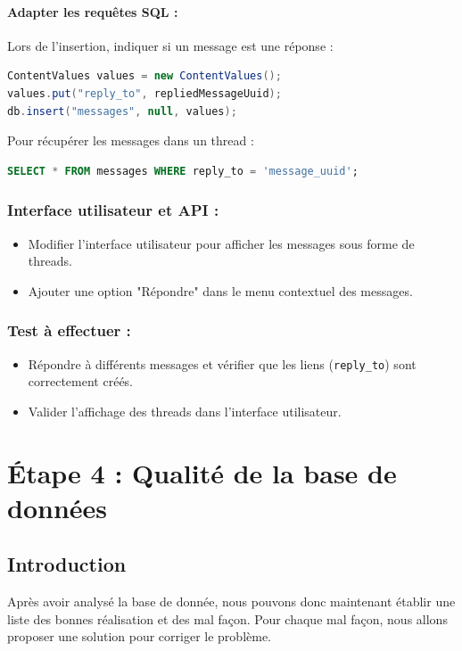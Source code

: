 \documentclass[a4paper,11pt]{article}
\begin{document}
\paragraph{Adapter les requêtes SQL :}
Lors de l'insertion, indiquer si un message est une réponse :
\begin{lstlisting}[language=Java]
ContentValues values = new ContentValues();
values.put("reply_to", repliedMessageUuid);
db.insert("messages", null, values);
\end{lstlisting}

Pour récupérer les messages dans un thread :
\begin{lstlisting}[language=SQL]
SELECT * FROM messages WHERE reply_to = 'message_uuid';
\end{lstlisting}

\subsubsection*{Interface utilisateur et API :}
\begin{itemize}
    \item Modifier l’interface utilisateur pour afficher les messages sous forme de threads.
    \item Ajouter une option "Répondre" dans le menu contextuel des messages.
\end{itemize}

\subsubsection*{Test à effectuer :}
\begin{itemize}
    \item Répondre à différents messages et vérifier que les liens (\texttt{reply\_to}) sont correctement créés.
    \item Valider l’affichage des threads dans l’interface utilisateur.
\end{itemize}

\section{Étape 4 : Qualité de la base de données}

\subsection*{Introduction}

Après avoir analysé la base de donnée, nous pouvons donc maintenant établir une liste des bonnes réalisation et des mal façon. Pour chaque mal façon, nous allons proposer une solution pour corriger le problème.
\end{document}
